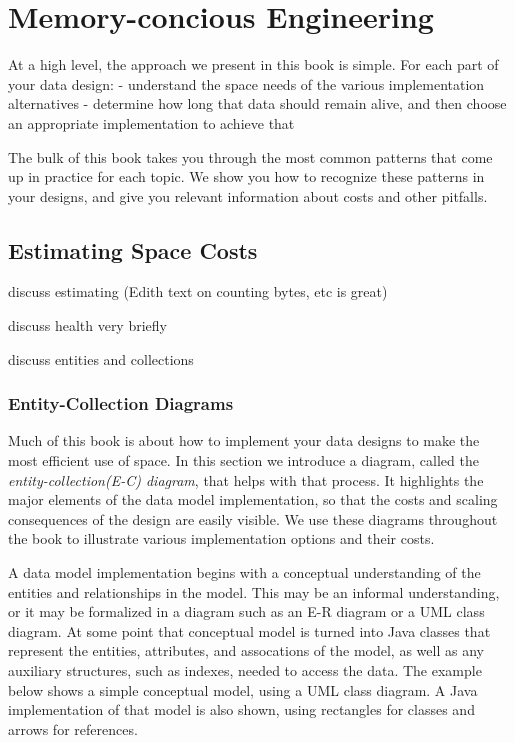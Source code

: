 \section{Memory-concious Engineering}

At a high level, the approach we present in this book is simple. For each part of your data design:
- understand the space needs of the various implementation alternatives
- determine how long that data should remain alive, and then choose an appropriate implementation to achieve that

The bulk of this book takes you through the most common patterns that come up in practice for each topic. We show you how to recognize
these patterns in your designs, and give you relevant information about costs and other pitfalls.  


\subsection{Estimating Space Costs}

discuss estimating (Edith text on counting bytes, etc is great)

discuss health very briefly

discuss entities and collections

\subsubsection{Entity-Collection Diagrams}

Much of this book is about how to implement your data designs to make the most efficient use of space. In this section we introduce a diagram, called the \emph{entity-collection(E-C) diagram}, that helps with that process. It highlights the major elements of the data model implementation, so that the costs and scaling consequences of the design are easily visible. We use these diagrams throughout the book to illustrate various implementation options and their costs.

A data model implementation begins with a conceptual understanding of the entities and relationships in the model.  This may be an informal understanding, or it may be formalized in a diagram such as an E-R diagram or a UML class diagram.  At some point that conceptual model is turned into Java classes that represent the entities, attributes, and assocations of the model, as well as any auxiliary structures, such as indexes, needed to access the data.  The example below shows a simple conceptual model, using a UML class diagram.  A Java implementation of that model is also shown, using rectangles for classes and arrows for references.  %


